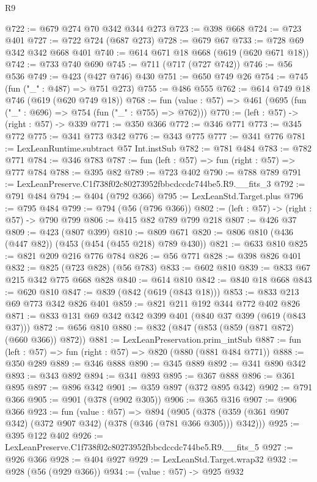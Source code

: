 \begin{lexlean}{R9}
\begin{coremodule}
@722 := @679 @274 @70 @342 @344 @273
@723 := @398 @668
@724 := @723 @401
@727 := @722 @724 (@687 @273)
@728 := @679 @67
@733 := @728 @69 @342 @342 @668 @401
@740 := @614 @671 @18 @668 (@619 (@620 @671 @18))
@742 := @733 @740 @690
@745 := @711 (@717 (@727 @742))
@746 := @56 @536
@749 := @423 (@427 @746) @430
@751 := @650 @749 @26
@754 := @745 (fun ("_" : @487) => @751 @273)
@755 := @486 @555
@762 := @614 @749 @18 @746 (@619 (@620 @749 @18))
@768 := fun (value : @57) => @461 (@695 (fun ("_" : @696) => @754 (fun ("_" : @755) => @762)))
@770 := (left : @57) -> (right : @57) -> @339
@771 := @350 @366
@772 := @346 @771
@773 := @345 @772
@775 := @341 @773 @342
@776 := @343 @775
@777 := @341 @776
@781 := LexLeanRuntime.subtract @57 Int.instSub
@782 := @781 @484
@783 := @782 @771
@784 := @346 @783
@787 := fun (left : @57) => fun (right : @57) => @777 @784
@788 := @395 @82
@789 := @723 @402
@790 := @788 @789
@791 := LexLeanPreserve.C1f738f02c80273952fbbcdccdc744be5.R9.__fits_3
@792 := @791 @484
@794 := @404 (@792 @366)
@795 := LexLeanStd.Target.plus
@796 := @795 @484
@799 := @794 (@56 (@796 @366))
@802 := (left : @57) -> (right : @57) -> @790 @799
@806 := @415 @82 @789 @799 @218
@807 := @426 @37
@809 := @423 (@807 @399)
@810 := @809 @671
@820 := @806 @810 (@436 (@447 @82)) (@453 (@454 (@455 @218) @789 @430))
@821 := @633 @810
@825 := @821 @209 @216 @776 @784
@826 := @56 @771
@828 := @398 @826 @401
@832 := @825 (@723 @828) (@56 @783)
@833 := @602 @810
@839 := @833 @67 @215 @342 @775 @668 @828
@840 := @614 @810
@842 := @840 @18 @668
@843 := @620 @810
@847 := @839 (@842 (@619 (@843 @18)))
@853 := @833 @213 @69 @773 @342 @826 @401
@859 := @821 @211 @192 @344 @772 @402 @826
@871 := @833 @131 @69 @342 @342 @399 @401 (@840 @37 @399 (@619 (@843 @37)))
@872 := @656 @810
@880 := @832 (@847 (@853 (@859 (@871 @872) (@660 @366)) @872))
@881 := LexLeanPreservation.prim_intSub
@887 := fun (left : @57) => fun (right : @57) => @820 (@880 (@881 @484 @771))
@888 := @350 @289
@889 := @346 @888
@890 := @345 @889
@892 := @341 @890 @342
@893 := @343 @892
@894 := @341 @893
@895 := @367 @888
@896 := @361 @895
@897 := @896 @342
@901 := @359 @897 (@372 @895 @342)
@902 := @791 @366
@905 := @901 (@378 (@902 @305))
@906 := @365 @316
@907 := @906 @366
@923 := fun (value : @57) =>
  @894 (@905 (@378 (@359 (@361 @907 @342) (@372 @907 @342) (@378 (@346 (@781 @366 @305))) @342)))
@925 := @395 @122 @402
@926 := LexLeanPreserve.C1f738f02c80273952fbbcdccdc744be5.R9.__fits_5
@927 := @926 @366
@928 := @404 @927
@929 := LexLeanStd.Target.wrap32
@932 := @928 (@56 (@929 @366))
@934 := (value : @57) -> @925 @932

\end{coremodule}
\end{lexlean}
